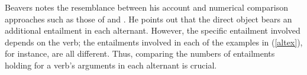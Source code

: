 \documentclass[output=paper
 	        ,biblatex
                ,babelshorthands
                ,newtxmath
                ,draftmode
                ,colorlinks, citecolor=brown
]{langscibook}
\begin{document}
Beavers notes the resemblance between his account and numerical comparison approaches such as those of \citet{Dowty1991} and \citet{AckermanandMoore2001}.
He points out that the direct object bears an additional entailment in each alternant. However, the specific entailment involved depends on the verb; the entailments involved in each of the examples in (\ref{altex}), for instance, are all different.  Thus, comparing the numbers of entailments holding for a verb's arguments in each alternant is crucial.

\end{document}
